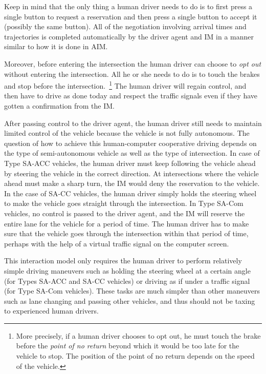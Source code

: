 Keep in mind that the only thing a human driver needs to do is to
first press a single button to request a reservation and then press a
single button to accept it (possibly the same button).  All of the
negotiation involving arrival times and trajectories is completed
automatically by the driver agent and IM in a manner similar to how it
is done in AIM.  

Moreover, before entering the intersection the human driver can
choose to \emph{opt out} without entering the intersection.  All he or she 
needs to do is to touch the brakes and stop before the
intersection.~\footnote{More precisely, if a human driver chooses to
opt out, he must touch the brake before the \emph{point of no return}
beyond which it would be too late for the vehicle to stop.  The
position of the point of no return depends on the speed of the
vehicle.}  The human driver will regain control, and then have to
drive as done today and respect the traffic signals even if they
have gotten a confirmation from the IM.

After passing control to the driver agent, the human driver still
needs to maintain limited control of the vehicle because the vehicle
is not fully autonomous.  The question of how to achieve this
human-computer cooperative driving depends on the type of
semi-autonomous vehicle as well as the type of intersection.  In
case of Type SA-ACC vehicles, the human driver must keep following the
vehicle ahead by steering the vehicle in the correct direction.  At
intersections where the vehicle ahead must make a sharp turn, the IM
would deny the reservation to the vehicle.  In the case of SA-CC
vehicles, the human driver simply holds the steering wheel to make the
vehicle goes straight through the intersection.  In Type SA-Com
vehicles, no control is passed to the driver agent, and the IM will
reserve the entire lane for the vehicle for a period of time.  The
human driver has to make sure that the vehicle goes through the
intersection within that period of time, perhaps with the help of a
virtual traffic signal on the computer screen.

This interaction model only requires the human driver to perform
relatively simple driving maneuvers such as holding the steering wheel
at a certain angle (for Types SA-ACC and SA-CC vehicles) or
driving as if under a traffic signal (for Type SA-Com vehicles).
These tasks are much simpler than other maneuvers such as lane
changing and passing other vehicles, and thus should not be taxing to experienced human drivers.  

